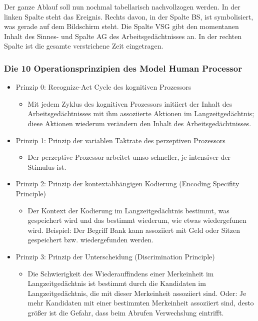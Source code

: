 \documentclass[paper=a4, fontsize=11pt]{scrartcl} %
\numberwithin{equation}{section} %
\numberwithin{figure}{section} %
\numberwithin{table}{section} %
\begin{document}
Der ganze Ablauf soll nun nochmal tabellarisch nachvollzogen werden.
In der linken Spalte steht das Ereignis. Rechts davon, in der Spalte BS, ist symbolisiert, was gerade auf dem Bildschirm steht. Die Spalte VSG gibt den momentanen Inhalt des Sinnes- und Spalte AG des Arbeitsgedächtnisses an.
In der rechten Spalte ist die gesamte verstrichene Zeit eingetragen.

\subsubsection{Die 10 Operationsprinzipien des Model Human Processor}

\begin{itemize}
\item Prinzip 0: Recognize-Act Cycle des kognitiven Prozessors
\begin{itemize}
\item Mit jedem Zyklus des kognitiven Prozessors initiiert der Inhalt des Arbeitsgedächtnisses mit ihm assoziierte Aktionen im Langzeitgedächtnis; diese Aktionen wiederum verändern den Inhalt des Arbeitsgedächtnisses.
\end{itemize}
\item Prinzip 1: Prinzip der variablen Taktrate des perzeptiven Prozessors
\begin{itemize}
\item Der perzeptive Prozessor arbeitet umso schneller, je intensiver der Stimulus ist.
\end{itemize}
\item Prinzip 2: Prinzip der kontextabhängigen Kodierung (Encoding Specifity Principle)
\begin{itemize}
\item Der Kontext der Kodierung im Langzeitgedächtnis bestimmt, was gespeichert wird und das bestimmt wiederum, wie etwas wiedergefunen wird. Beispiel: Der Begriff Bank kann assoziiert mit Geld oder Sitzen gespeichert bzw. wiedergefunden werden.
\end{itemize}
\item Prinzip 3: Prinzip der Unterscheidung (Discrimination Principle)
\begin{itemize}
\item Die Schwierigkeit des Wiederauffindens einer Merkeinheit im Langzeitgedächtnis ist bestimmt durch die Kandidaten im Langzeitgedächtnis, die mit dieser Merkeinheit assoziiert sind. Oder: Je mehr Kandidaten mit einer bestimmten Merkeinheit assoziiert sind, desto größer ist die Gefahr, dass beim Abrufen Verwechslung eintrifft.

\end{itemize}
\end{itemize}
\end{document}
